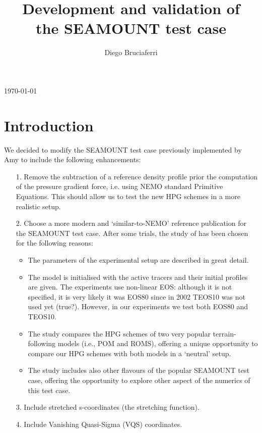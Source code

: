 \documentclass[authoryear]{elsarticle}
\begin{document}
\begin{frontmatter}

\title{Development and validation of \\ the SEAMOUNT test case}

\author{Diego Bruciaferri}
\address{Met Office, Fitzroy Rd, Exeter, UK }

\begin{abstract}
\end{abstract}

\end{frontmatter}


\today{}

\section{Introduction} 

We decided to modify the SEAMOUNT test case previously implemented by Amy to include the following enhancements:

\begin{itemize}
	\item[1.] Remove the subtraction of a reference density profile prior the computation of the pressure gradient force, i.e. using NEMO standard Primitive Equations. This should allow us to test the new HPG schemes in a more realistic setup.
	\item[2.] Choose a more modern and `similar-to-NEMO' reference publication for the SEAMOUNT test case. After some trials, the study of \cite{Ezer2002} has been chosen for the following reasons:
	\begin{itemize}
		\item The parameters of the experimental setup are described in great detail.
		\item The model is initialised with the active tracers and their initial profiles are given.
		      The experiments use non-linear EOS: although it is not specified, it is very likely it was EOS80 since in 2002 TEOS10 was not used yet (true?). However, in our experiments we test both EOS80 and TEOS10.
		\item The study compares the HPG schemes of two very popular terrain-following models (i.e., 
		      POM and ROMS), offering a unique opportunity to compare our HPG schemes with both models in a `neutral' setup.
		\item The study includes also other flavours of the popular SEAMOUNT test case, offering the 
		      opportunity to explore other aspect of the numerics of this test case. 
    \end{itemize}
    \item[3.] Include stretched s-coordinates (the \cite{Song1994} stretching function). 
    \item[4.] Include Vanishing Quasi-Sigma (VQS) coordinates.
\end{itemize}
\end{document}
